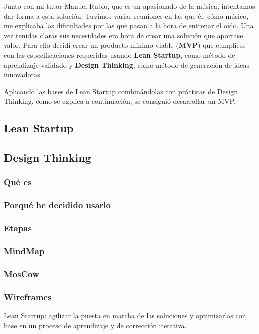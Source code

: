 \documentclass[12pt,twoside,titlepage]{report}
\begin{document}
Junto con mi tutor Manuel Rubio, que es un apasionado de la música, intentamos dar forma a esta solución. Tuvimos varias reuniones en las que él, cómo músico, me explicaba las dificultades por las que pasan a la hora de entrenar el oído. Una vez tenidas claras sus necesidades era hora de crear una solución que aportase valor. Para ello decidí crear un producto mínimo viable (\textbf{MVP}) que cumpliese con las especificaciones requeridas usando \textbf{Lean Startup}, como método de aprendizaje validado y \textbf{Design Thinking}, como método de generación de ideas innovadoras.

Aplicando las bases de Lean Startup combinándolas con prácticas de Design Thinking, como se explica a continuación, se consiguió desarrollar un MVP.

\subsection{Lean Startup}

\subsection{Design Thinking}

\subsubsection{Qué es}
\subsubsection{Porqué he decidido usarlo}
\subsubsection{Etapas}


\subsubsection{MindMap}

\subsubsection{MosCow}

\subsubsection{Wireframes}


Lean Startup: agilizar la puesta en marcha de las soluciones y optimizarlas con base en un proceso de aprendizaje y de corrección iterativa.
\end{document}
